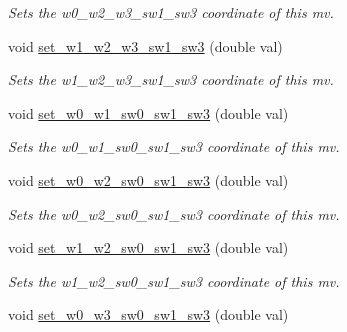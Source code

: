 \begin{DoxyCompactItemize}
\begin{DoxyCompactList}\small\item\em Sets the w0\-\_\-w2\-\_\-w3\-\_\-sw1\-\_\-sw3 coordinate of this mv. \end{DoxyCompactList}\item 
\hypertarget{classe3ga_1_1mv_ad777373c0c4cf1e94e82502c7bef5b8f}{void \hyperlink{classe3ga_1_1mv_ad777373c0c4cf1e94e82502c7bef5b8f}{set\-\_\-w1\-\_\-w2\-\_\-w3\-\_\-sw1\-\_\-sw3} (double val)}\label{classe3ga_1_1mv_ad777373c0c4cf1e94e82502c7bef5b8f}

\begin{DoxyCompactList}\small\item\em Sets the w1\-\_\-w2\-\_\-w3\-\_\-sw1\-\_\-sw3 coordinate of this mv. \end{DoxyCompactList}\item 
\hypertarget{classe3ga_1_1mv_ae29a42a48d845259b2b94d30e679a730}{void \hyperlink{classe3ga_1_1mv_ae29a42a48d845259b2b94d30e679a730}{set\-\_\-w0\-\_\-w1\-\_\-sw0\-\_\-sw1\-\_\-sw3} (double val)}\label{classe3ga_1_1mv_ae29a42a48d845259b2b94d30e679a730}

\begin{DoxyCompactList}\small\item\em Sets the w0\-\_\-w1\-\_\-sw0\-\_\-sw1\-\_\-sw3 coordinate of this mv. \end{DoxyCompactList}\item 
\hypertarget{classe3ga_1_1mv_a4eeb566c9de7f318839d40b8fa759638}{void \hyperlink{classe3ga_1_1mv_a4eeb566c9de7f318839d40b8fa759638}{set\-\_\-w0\-\_\-w2\-\_\-sw0\-\_\-sw1\-\_\-sw3} (double val)}\label{classe3ga_1_1mv_a4eeb566c9de7f318839d40b8fa759638}

\begin{DoxyCompactList}\small\item\em Sets the w0\-\_\-w2\-\_\-sw0\-\_\-sw1\-\_\-sw3 coordinate of this mv. \end{DoxyCompactList}\item 
\hypertarget{classe3ga_1_1mv_a3247f6ff05d590d98901f1205970cbbc}{void \hyperlink{classe3ga_1_1mv_a3247f6ff05d590d98901f1205970cbbc}{set\-\_\-w1\-\_\-w2\-\_\-sw0\-\_\-sw1\-\_\-sw3} (double val)}\label{classe3ga_1_1mv_a3247f6ff05d590d98901f1205970cbbc}

\begin{DoxyCompactList}\small\item\em Sets the w1\-\_\-w2\-\_\-sw0\-\_\-sw1\-\_\-sw3 coordinate of this mv. \end{DoxyCompactList}\item 
\hypertarget{classe3ga_1_1mv_af1a0399ad660a1af92d8aa1ba220ff82}{void \hyperlink{classe3ga_1_1mv_af1a0399ad660a1af92d8aa1ba220ff82}{set\-\_\-w0\-\_\-w3\-\_\-sw0\-\_\-sw1\-\_\-sw3} (double val)}\label{classe3ga_1_1mv_af1a0399ad660a1af92d8aa1ba220ff82}


\end{DoxyCompactItemize}
